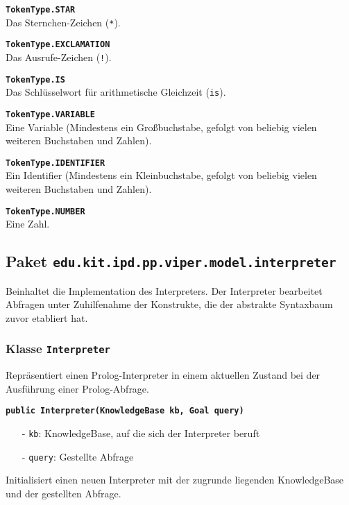 \documentclass[parskip=full,11pt,twoside]{scrartcl}
\begin{document}
\textbf{\texttt{TokenType.STAR}}\\
Das Sternchen-Zeichen (\texttt{*}).

\textbf{\texttt{TokenType.EXCLAMATION}}\\
Das Ausrufe-Zeichen (\texttt{!}).

\textbf{\texttt{TokenType.IS}}\\
Das Schlüsselwort für arithmetische Gleichzeit (\texttt{is}).

\textbf{\texttt{TokenType.VARIABLE}}\\
Eine Variable (Mindestens ein Großbuchstabe, gefolgt von beliebig vielen weiteren Buchstaben und Zahlen).

\textbf{\texttt{TokenType.IDENTIFIER}}\\
Ein Identifier (Mindestens ein Kleinbuchstabe, gefolgt von beliebig vielen weiteren Buchstaben und Zahlen).

\textbf{\texttt{TokenType.NUMBER}}\\
Eine Zahl.

\newpage
\subsection{Paket \texttt{edu.kit.ipd.pp.viper.model.interpreter}}

Beinhaltet die Implementation des Interpreters. Der Interpreter bearbeitet Abfragen unter Zuhilfenahme der Konstrukte, die der abstrakte Syntaxbaum zuvor etabliert hat.

\newpage
\newpage

\subsubsection{Klasse \texttt{Interpreter}}
Repräsentiert einen Prolog-Interpreter in einem aktuellen Zustand bei der Ausführung einer Prolog-Abfrage.

\textbf{\texttt{public Interpreter(KnowledgeBase kb, Goal query)}}
\begin{itemize}[noitemsep]
	\item[-] \texttt{kb}: KnowledgeBase, auf die sich der Interpreter beruft
	\item[-] \texttt{query}: Gestellte Abfrage
\end{itemize}
Initialisiert einen neuen Interpreter mit der zugrunde liegenden KnowledgeBase und der gestellten Abfrage.
\end{document}
